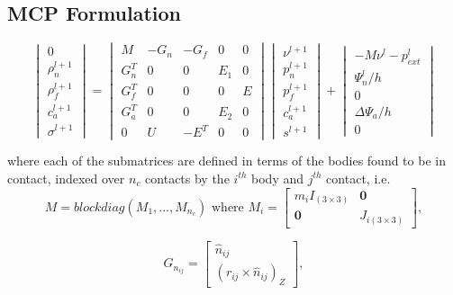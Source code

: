 \documentclass{article}
\begin{document}
\subsection{MCP Formulation}
\begin{equation}
\begin{vmatrix}
0 \\ \rho_{n}^{l+1} \\ \rho_{f}^{l+1} \\ c_{a}^{l+1}  \\ \sigma^{l+1} 
\end{vmatrix} =
\begin{vmatrix} 
M & -G_{n} & -G_{f} & 0 & 0 \\
G_{n}^{T} & 0 & 0 & E_1 & 0 \\
G_{f}^{T} & 0 & 0 & 0 & E \\
G_a^{T} & 0 & 0 & E_2 & 0 \\
0 & U & -E^{T} & 0 & 0 
 \end{vmatrix} 
\begin{vmatrix}
\nu^{l+1} \\
p_{n}^{l+1} \\
p_{f}^{l+1} \\
c_{a}^{l+1} \\
s^{l+1}
\end{vmatrix} + 
\begin{vmatrix}
-M\nu^{l}-p_{ext}^{l} \\
\Psi_{n}^{l}/h \\
0 \\
\Delta \Psi_a / h  \\
0
\end{vmatrix}
\end{equation}


where each of the submatrices are defined in terms of the bodies found to be in contact, indexed over $n_c$ contacts by the $i^{th}$ body and $j^{th}$ contact, i.e.\\
\begin{equation}
M = blockdiag(M_1,...,M_{n_c})
\text{ where } 
M_i = \begin{bmatrix} m_iI_{(3\times3)} & \mathbf{0} \\ \mathbf{0} & J_{i (3\times3)}  \end{bmatrix}, 
\nonumber
\end{equation}


\begin{equation}
G_{n_{ij}} = \begin{bmatrix} 
\hat{n}_{ij}  \\ 
(r_{ij} \times \hat{n}_{ij})_{Z}
\end{bmatrix},  \nonumber
\end{equation}
\end{document}
